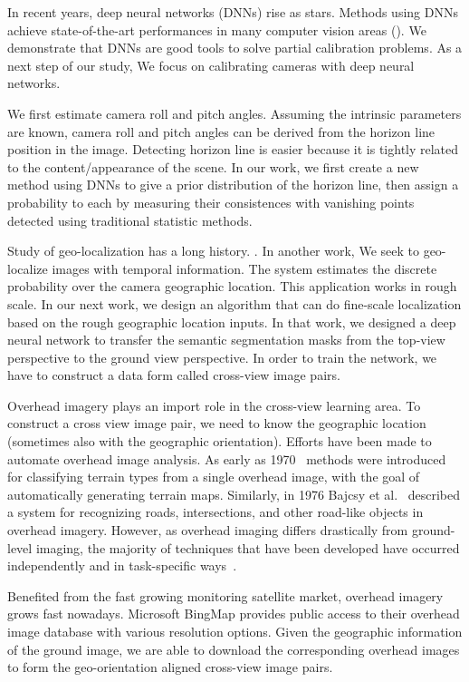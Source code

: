 In recent years, deep neural networks (DNNs) rise as stars. Methods
using DNNs achieve state-of-the-art performances in
many computer vision areas (). We demonstrate that
DNNs are good tools to solve partial calibration problems. 
As a next step of our study, We focus on calibrating cameras with deep
neural networks.

We first estimate camera roll and pitch angles. Assuming the intrinsic
parameters are known, camera roll and pitch angles can be
derived from the horizon line position in the image. Detecting horizon
line is easier because it is tightly related to the content/appearance
of the scene. In our work, we first create a new method using DNNs to
give a prior distribution of the horizon line, then assign a
probability to each by measuring their consistences with vanishing
points detected using traditional statistic methods.

Study of geo-localization has a long history. . In
another work, We seek to geo-localize images with temporal
information. The system estimates the discrete probability over the
camera geographic location. This application works in rough scale. In
our next work, we design an algorithm that can do fine-scale localization
based on the rough geographic location inputs. In that work, we
designed a deep neural network to transfer the semantic segmentation
masks from the top-view perspective to the ground view perspective. In
order to train the network, we have to construct a data form called
cross-view image pairs.

Overhead imagery plays an import role in the cross-view learning area.
To construct a cross view image pair, we need to know the geographic
location (sometimes also with the geographic orientation).
 Efforts have been made to
automate overhead image analysis. As early as
1970~\cite{idelsohn1970learning} methods were introduced for
classifying terrain types from a single overhead image, with the goal
of automatically generating terrain maps.  Similarly, in 1976 Bajcsy
et al.~\cite{bajcsy1976computer} described a system for recognizing
roads, intersections, and other road-like objects in overhead imagery.
However, as overhead imaging differs drastically from ground-level
imaging, the majority of techniques that have been developed have
occurred independently and in task-specific ways~\cite{Rozen}.

Benefited from the fast growing monitoring satellite market, overhead
imagery grows fast nowadays. Microsoft BingMap provides public access
to their overhead image database with various resolution options.
Given the geographic information of the ground image, we are able to
download the corresponding overhead images to form the geo-orientation
aligned cross-view image pairs.

